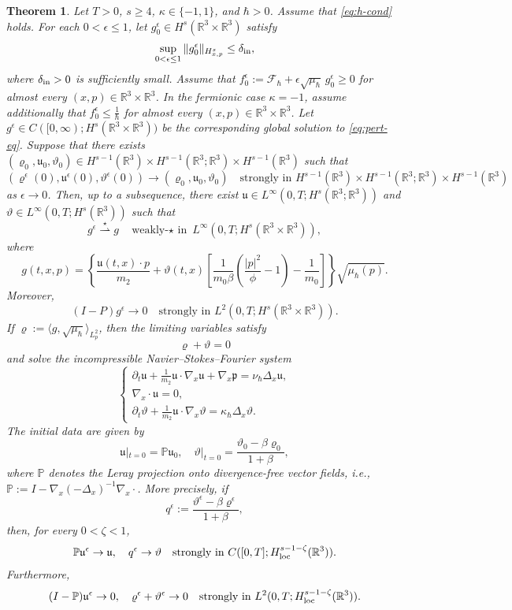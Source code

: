 \documentclass[10pt,reqno]{amsart}
\numberwithin{equation}{section}
\newtheorem{theorem}{Theorem}[section]
\newcommand{\lt}{\left}
\newcommand{\rt}{\right}
\newcommand{\lal}{\langle}
\newcommand{\ral}{\rangle}
\newcommand{\mP}{\mathbb{P}}
\newcommand{\vrh}{\varrho}
\newcommand{\vth}{\vartheta}
\newcommand{\mfu}{\mathfrak{u}}
\newcommand{\R}{\mathbb R}
\newcommand{\bq}{\begin{equation}}
\newcommand{\eq}{\end{equation}}
\newcommand{\pa}{\partial}
\newcommand{\calF}{\mathcal F}
\begin{document}
\begin{theorem}\label{thm:NSF-limit}
Let $T>0$, $s\ge4$, $\kappa\in\{-1,1\}$, and $\hbar>0$. Assume that \eqref{eq:h-cond} holds. For each $0<\epsilon\le1$, let $g^\epsilon_0\in H^s(\R^3\times\R^3)$ satisfy
\[
\sup_{0<\epsilon\le1}\|g^\epsilon_0\|_{H^s_{x,p}}\le\delta_{\rm in},
\]
where $\delta_{\rm in}>0$ is sufficiently small. Assume that $f^\epsilon_0:=\calF_\hbar+\epsilon\sqrt{\mu_\hbar}\,g^\epsilon_0\ge0$ for almost every $(x,p)\in\R^3\times\R^3$. In the fermionic case $\kappa=-1$, assume additionally that $f^\epsilon_0\le\frac{1}{\hbar}$ for almost every $(x,p)\in\R^3\times\R^3$. Let $g^\epsilon\in C([0,\infty);H^s(\R^3\times\R^3))$ be the corresponding global solution to \eqref{eq:pert-eq}. 
Suppose that there exists $(\vrh_0,\mfu_0,\vth_0)\in H^{s-1}(\R^3)\times H^{s-1}(\R^3;\R^3)\times H^{s-1}(\R^3)$ such that
\[
(\vrh^\epsilon(0),\mfu^\epsilon(0),\vth^\epsilon(0))\to(\vrh_0,\mfu_0,\vth_0)\quad\text{strongly in }H^{s-1}(\R^3)\times H^{s-1}(\R^3;\R^3)\times H^{s-1}(\R^3)
\]
as $\epsilon\to0$. Then, up to a subsequence, there exist $\mfu\in L^\infty(0,T;H^s(\R^3;\R^3))$ and $\vth\in L^\infty(0,T;H^s(\R^3))$ such that
\[
g^\epsilon\overset{\star}{\rightharpoonup}g \quad\text{weakly-$\star$ in }L^\infty(0,T;H^s(\R^3\times\R^3)),
\]
where
\[
g(t,x,p)=\lt\{\frac{\mfu(t,x)\cdot p}{m_2}+\vth(t,x)\lt[\frac{1}{m_0\beta}\lt(\frac{|p|^2}{\phi}-1\rt)-\frac{1}{m_0}\rt]\rt\}\sqrt{\mu_\hbar(p)}.
\]
Moreover,
\[
(I-P)g^\epsilon\to0 \quad\text{strongly in }L^2(0,T;H^s(\R^3\times\R^3)).
\]
If $\vrh:=\lal g,\sqrt{\mu_\hbar}\ral_{L^2_p}$, then the limiting variables satisfy
\[
\vrh+\vth=0
\]
and solve the incompressible Navier--Stokes--Fourier system
\bq\label{eq:NSF-main}
\begin{cases}
\displaystyle \pa_t\mfu+\frac{1}{m_2}\mfu\cdot\nabla_x\mfu+\nabla_x\mathfrak p=\nu_\hbar\Delta_x\mfu,\\[2mm]
\nabla_x\cdot\mfu=0,\\[2mm]
\displaystyle \pa_t\vth+\frac{1}{m_2}\mfu\cdot\nabla_x\vth=\kappa_\hbar\Delta_x\vth.
\end{cases}
\eq
The initial data are given by
\[
\mfu|_{t=0}=\mP\mfu_0,\quad \vth|_{t=0}=\frac{\vth_0-\beta\vrh_0}{1+\beta},
\]
where $\mP$ denotes the Leray projection onto divergence-free vector fields, i.e., $\mP :=I-\nabla_x(-\Delta_x)^{-1}\nabla_x\cdot $. More precisely, if
\[
q^\epsilon:=\frac{\vth^\epsilon-\beta\vrh^\epsilon}{1+\beta},
\]
then, for every $0<\zeta<1$,
\[
\mP\mfu^\epsilon\to\mfu,\quad q^\epsilon\to\vth \quad \text{strongly in } C([0,T];H^{s-1-\zeta}_{\rm loc}(\R^3)).
\]
Furthermore,
\[
(I-\mP)\mfu^\epsilon\to0,\quad \vrh^\epsilon+\vth^\epsilon\to0 \quad \text{strongly in } L^2(0,T;H^{s-1-\zeta}_{\rm loc}(\R^3)).
\]
\end{theorem}
\end{document}
